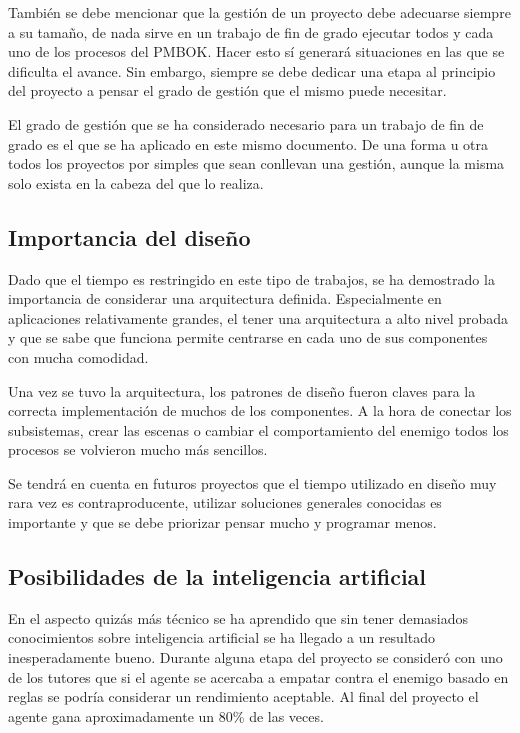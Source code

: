 \bigskip

También se debe mencionar que la gestión de un proyecto debe adecuarse siempre a su tamaño, de nada sirve en un trabajo de fin de grado ejecutar todos y cada uno de los procesos del PMBOK\cite{pmbok}. Hacer esto sí generará situaciones en las que se dificulta el avance. Sin embargo, siempre se debe dedicar una etapa al principio del proyecto a pensar el grado de gestión que el mismo puede necesitar.

\bigskip

El grado de gestión que se ha considerado necesario para un trabajo de fin de grado es el que se ha aplicado en este mismo documento. De una forma u otra todos los proyectos por simples que sean conllevan una gestión, aunque la misma solo exista en la cabeza del que lo realiza.

\subsection{Importancia del diseño}

Dado que el tiempo es restringido en este tipo de trabajos, se ha demostrado la importancia de considerar una arquitectura definida. Especialmente en aplicaciones relativamente grandes, el tener una arquitectura a alto nivel probada y que se sabe que funciona permite centrarse en cada uno de sus componentes con mucha comodidad.

\bigskip

Una vez se tuvo la arquitectura, los patrones de diseño fueron claves para la correcta implementación de muchos de los componentes. A la hora de conectar los subsistemas, crear las escenas o cambiar el comportamiento del enemigo todos los procesos se volvieron mucho más sencillos.

\bigskip

Se tendrá en cuenta en futuros proyectos que el tiempo utilizado en diseño muy rara vez es contraproducente, utilizar soluciones generales conocidas es importante y que se debe priorizar pensar mucho y programar menos.

\subsection{Posibilidades de la inteligencia artificial}

En el aspecto quizás más técnico se ha aprendido que sin tener demasiados conocimientos sobre inteligencia artificial se ha llegado a un resultado inesperadamente bueno. Durante alguna etapa del proyecto se consideró con uno de los tutores que si el agente se acercaba a empatar contra el enemigo basado en reglas se podría considerar un rendimiento aceptable. Al final del proyecto el agente gana aproximadamente un 80\% de las veces.

